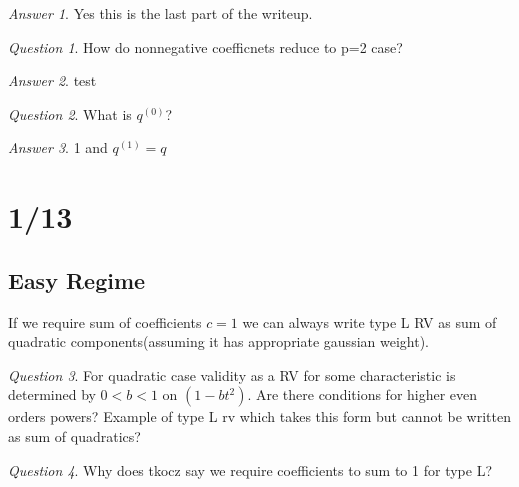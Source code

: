 \documentclass[11pt]{article}
\theoremstyle{remark}
\newtheorem*{quest}{Question}
\newtheorem*{ans}{Answer}
\begin{document}
\begin{ans}
	Yes this is the last part of the writeup.
\end{ans}

\begin{quest}
	How do nonnegative coefficnets reduce to p=2 case?
\end{quest}

\begin{ans}
	test
\end{ans}

\begin{quest}
	What is $q^{(0)}$?
\end{quest}
\begin{ans}
	1 and $q^{(1)} = q$
\end{ans}

\section{1/13}

\subsection{Easy Regime}

\begin{remark}
	If we require sum of coefficients $c=1$ we can always write type L RV as sum of quadratic components(assuming it has appropriate gaussian weight).
\end{remark}

\begin{quest}
	For quadratic case validity as a RV for some characteristic is determined by $0 < b < 1$ on $(1-bt^2)$. Are there conditions for higher even orders powers? Example of type L rv which takes this form but cannot be written as sum of quadratics?
\end{quest}

\begin{quest}
	Why does tkocz say we require coefficients to sum to 1 for type L?
\end{quest}
\end{document}
